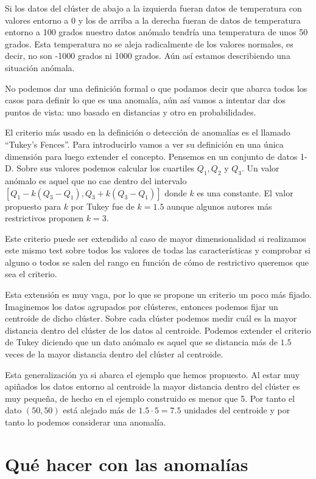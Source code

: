 Si los datos del clúster de abajo a la izquierda fueran datos de temperatura con valores entorno a 0 y los de arriba a la derecha fueran de datos de temperatura entorno a 100 grados nuestro datos anómalo tendría una temperatura de unos 50 grados. Esta temperatura no se aleja radicalmente de los valores normales, es decir, no son -1000 grados ni 1000 grados. Aún así estamos describiendo una situación anómala.

No podemos dar una definición formal o que podamos decir que abarca todos los casos para definir lo que es una anomalía, aún así vamos a intentar dar dos puntos de vista: uno basado en distancias y otro en probabilidades.

El criterio más usado en la definición o detección de anomalías es el llamado ``Tukey's Fences''. Para introducirlo vamos a ver su definición en una única dimensión para luego extender el concepto. Pensemos en un conjunto de datos 1-D. Sobre sus valores podemos calcular los cuartiles $Q_1 , Q_2 $ y $Q_3$. Un valor anómalo es aquel que no cae dentro del intervalo $[Q_1 - k(Q_3 - Q_1), Q_3 + k(Q_3 - Q_1)]$ donde $k$ es una constante. El valor propuesto para $k$ por Tukey fue de $k=1.5$ aunque algunos autores más restrictivos proponen $k=3$.

Este criterio puede ser extendido al caso de mayor dimensionalidad si realizamos este mismo test sobre todos los valores de todas las características y comprobar si alguno o todos se salen del rango en función de cómo de restrictivo queremos que sea el criterio.

Esta extensión es muy vaga, por lo que se propone un criterio un poco más fijado. Imaginemos los datos agrupados por clústeres, entonces podemos fijar un centroide de dicho clúster. Sobre cada clúster podemos medir cuál es la mayor distancia dentro del clúster de los datos al centroide. Podemos extender el criterio de Tukey diciendo que un dato anómalo es aquel que se distancia más de $1.5$ veces de la mayor distancia dentro del clúster al centroide.

Esta generalización ya si abarca el ejemplo que hemos propuesto. Al estar muy apiñados los datos entorno al centroide la mayor distancia dentro del clúster es muy pequeña, de hecho en el ejemplo construido es menor que 5. Por tanto el dato $(50,50)$ está alejado más de $1.5 \cdot 5 = 7.5$ unidades del centroide y por tanto lo podemos considerar una anomalía.

\section{Qué hacer con las anomalías}

